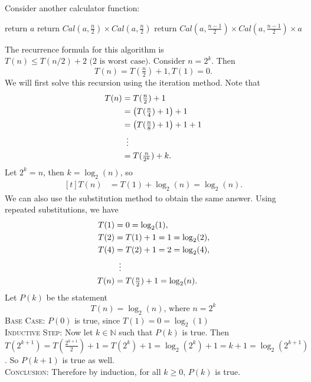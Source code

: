 \documentclass{article}
\begin{document}
    \vspace{1.5mm}
    Consider another calculator function:
    \begin{algorithm}
    \caption{Calculator($a$, $n$)}\label{alg:Calc2}
    \begin{algorithmic}
            \State return $a$
            \State return $Cal(a, \tfrac{n}{2}) \times Cal(a, \tfrac{n}{2})$
            \State return $Cal(a, \tfrac{n - 1}{2}) \times Cal(a, \tfrac{n - 1}{2}) \times a$
        \EndIf
    \end{algorithmic}
    \end{algorithm}
    
    The recurrence formula for this algorithm is $T(n) \le T(n/2) + 2 \text{ (2 is worst case)}$. Consider $n = 2^{k}$. Then $$T(n) = T(\tfrac{n}{2}) + 1, T(1) = 0.$$
    We will first solve this recursion using the iteration method. Note that
    $$\begin{aligned}[t]
        T(n) &= T(\tfrac{n}{2}) + 1 \\
        &= \left(T(\tfrac{n}{4}) + 1\right) + 1 \\
        &= \left(T(\tfrac{n}{8}) + 1\right) + 1 + 1 \\
        &\vdotswithin{ = } \\
        &= T(\tfrac{n}{2^{k}}) + k.
    \end{aligned}$$
    Let $2^{k} = n$, then $k = \log_{2}(n)$, so 
    $$\begin{aligned}[t]
        T(n) &= T(1) + \log_{2}(n) = \log_{2}(n).
    \end{aligned}$$
    We can also use the substitution method to obtain the same answer. Using repeated substitutions, we have
    \begin{align*}
        T(1) &= 0 = \log_{2}(1), \\
        T(2) &= T(1) + 1 = 1 = \log_{2}(2), \\
        T(4) &= T(2) + 1 = 2 = \log_{2}(4), \\
        &\vdotswithin{ = } \\
        T(n) &= T(\tfrac{n}{2}) + 1 = \log_{2}(n).
    \end{align*}
    Let $P(k)$ be the statement $$T(n) = \log_{2}(n) \text{, where $n = 2^{k}$}$$
    \textsc{Base Case}: $P(0)$ is true, since $T(1) = 0 = \log_{2}(1)$ \\
    \textsc{Inductive Step}: Now let $k \in \mathbb{N}$ such that $P(k)$ is true. Then $T(2^{k + 1}) = T(\tfrac{2^{k + 1}}{2}) + 1 = T(2^{k}) + 1 = \log_{2}(2^{k}) + 1 = k + 1 = \log_{2}(2^{k+1})$. So $P(k + 1)$ is true as well. \\
    \textsc{Conclusion}: Therefore by induction, for all $k \ge 0$, $P(k)$ is true.
\end{document}
